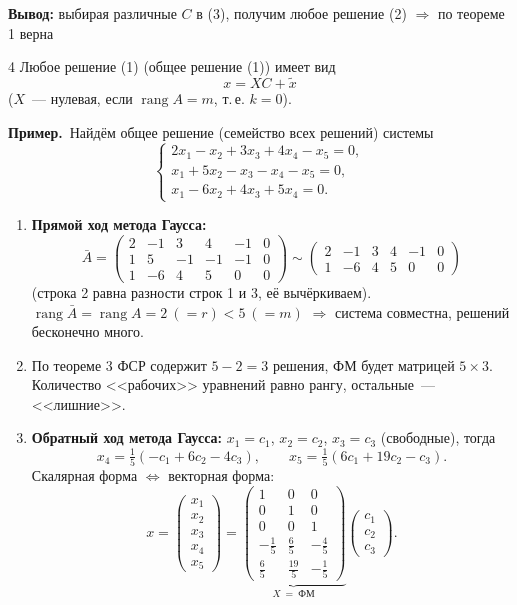 \documentclass[a4paper,11pt]{article}
\newcommand{\prim}{\textbf{Пример.}\ }
\newcommand{\rang}{\operatorname{rang}}
\begin{document}
\textbf{Вывод:} выбирая различные $C$ в (3), получим любое решение (2) $\Rightarrow$ по теореме 1 верна
\begin{teor}{4}
Любое решение (1) (общее решение (1)) имеет вид
\[
x=XC+\tilde x\tag{4}
\]
($X$~--- нулевая, если $\rang A=m$, т.\,е. $k=0$).
\end{teor}

\prim Найдём общее решение (семейство всех решений) системы
\[
\begin{cases}
2x_1-x_2+3x_3+4x_4-x_5=0,\\
x_1+5x_2-x_3-x_4-x_5=0,\\
x_1-6x_2+4x_3+5x_4=0.
\end{cases}\tag{5}
\]

\begin{enumerate}[label=\arabic*.]
\item \textbf{Прямой ход метода Гаусса:}
\[
\bar A=\left(\begin{array}{rrrrr|r}2&-1&3&4&-1&0\\1&5&-1&-1&-1&0\\1&-6&4&5&0&0\end{array}\right)
\sim\left(\begin{array}{rrrrr|r}2&-1&3&4&-1&0\\1&-6&4&5&0&0\end{array}\right)
\]
(строка 2 равна разности строк 1 и 3, её вычёркиваем).
$\rang\bar A=\rang A=2\ (=r)<5\ (=m)$ $\Rightarrow$ система совместна, решений бесконечно много.
\item По теореме 3 ФСР содержит $5-2=3$ решения, ФМ будет матрицей $5\times3$. Количество <<рабочих>> уравнений равно рангу, остальные~--- <<лишние>>.
\item \textbf{Обратный ход метода Гаусса:} $x_1=c_1$, $x_2=c_2$, $x_3=c_3$ (свободные), тогда
\[
x_4=\tfrac15(-c_1+6c_2-4c_3),\qquad x_5=\tfrac15(6c_1+19c_2-c_3).
\]
Скалярная форма $\iff$ векторная форма:
\[
x=\begin{pmatrix}x_1\\x_2\\x_3\\x_4\\x_5\end{pmatrix}
=\underbrace{\begin{pmatrix}1&0&0\\0&1&0\\0&0&1\\-\frac15&\frac65&-\frac45\\[2pt]\frac65&\frac{19}5&-\frac15\end{pmatrix}}_{X\ =\ \text{ФМ}}
\begin{pmatrix}c_1\\c_2\\c_3\end{pmatrix}.
\]
\end{enumerate}
\end{document}
